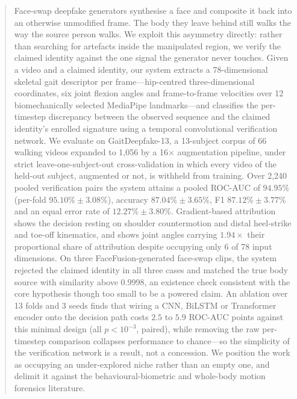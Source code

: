 \documentclass[journal]{IEEEtran}
\begin{document}
\begin{abstract}
Face-swap deepfake generators synthesise a face and composite it back into an
otherwise unmodified frame. The body they leave behind still walks the way the
source person walks. We exploit this asymmetry directly: rather than searching
for artefacts inside the manipulated region, we verify the claimed identity
against the one signal the generator never touches. Given a video and a claimed
identity, our system extracts a 78-dimensional skeletal gait descriptor per
frame---hip-centred three-dimensional coordinates, six joint flexion angles and
frame-to-frame velocities over 12 biomechanically selected MediaPipe
landmarks---and classifies the per-timestep discrepancy between the observed
sequence and the claimed identity's enrolled signature using a temporal
convolutional verification network. We evaluate on GaitDeepfake-13, a
13-subject corpus of 66 walking videos expanded to 1{,}056 by a
16$\times$ augmentation pipeline, under strict leave-one-subject-out
cross-validation in which every video of the held-out subject, augmented or
not, is withheld from training. Over 2{,}240 pooled verification pairs the
system attains a pooled ROC-AUC of $94.95\%$ (per-fold $95.10\% \pm 3.08\%$),
accuracy $87.04\% \pm 3.65\%$, F1 $87.12\% \pm 3.77\%$ and an equal error rate
of $12.27\% \pm 3.80\%$. Gradient-based attribution shows the decision resting
on shoulder countermotion and distal heel-strike and toe-off kinematics, and
shows joint angles carrying $1.94\times$ their proportional share of
attribution despite occupying only 6 of 78 input dimensions. On three
FaceFusion-generated face-swap clips, the system rejected the claimed identity
in all three cases and matched the true body source with similarity above
$0.9998$, an existence check consistent with the core hypothesis though too
small to be a powered claim. An ablation over 13 folds and 3 seeds finds that wiring a
CNN, BiLSTM or Transformer encoder onto the decision path costs $2.5$ to $5.9$
ROC-AUC points against this minimal design (all $p < 10^{-3}$, paired), while
removing the raw per-timestep comparison collapses performance to chance---so
the simplicity of the verification network is a result, not a concession. We
position the work as occupying an under-explored niche rather than an empty
one, and delimit it against the behavioural-biometric and whole-body motion
forensics literature.
\end{abstract}
\end{document}
